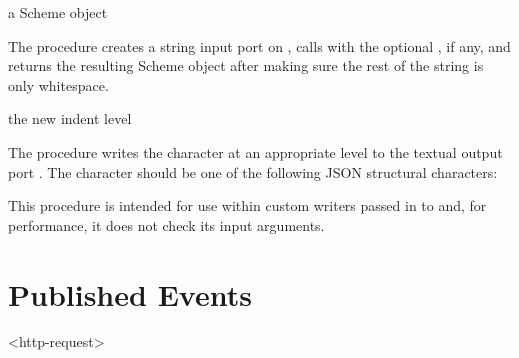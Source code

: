 \begin{procedure}
\end{procedure}
\returns{} a Scheme object

The  procedure creates a string input port
on , calls  with the optional ,
if any, and returns the resulting Scheme object after making sure the rest
of the string is only whitespace.

\begin{procedure}
\end{procedure}
\returns{} the new indent level

The  procedure writes the character
 at an appropriate  level to the textual output
port . The character should be one of the following JSON
structural characters: \code{[ ] \{ \} : ,}

This procedure is intended for use within custom writers passed in to
 and, for performance, it does not check its input arguments.

\section {Published Events}

\begin{pubevent}{<http-request>}
\end{pubevent}
